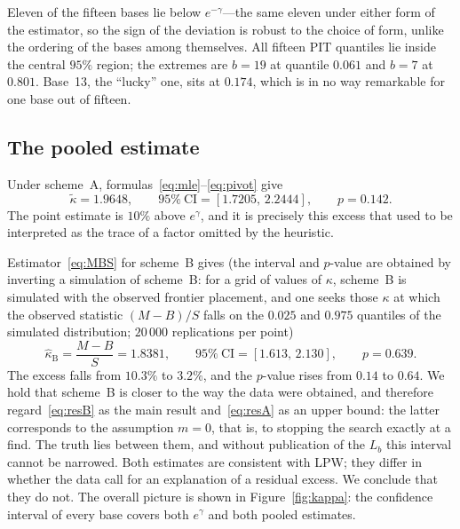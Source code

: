 \documentclass[11pt,a4paper]{article}
\theoremstyle{plain}
\theoremstyle{remark}
\newcommand{\eg}{e^{\gamma}}
\newcommand{\emg}{e^{-\gamma}}
\begin{document}
Eleven of the fifteen bases lie below $\emg$---the same eleven under either form
of the estimator, so the sign of the deviation is robust to the choice of form,
unlike the ordering of the bases among themselves. All fifteen PIT quantiles lie
inside the central $95\%$ region; the extremes are $b=19$ at quantile $0.061$
and $b=7$ at $0.801$. Base~13, the ``lucky'' one, sits at $0.174$, which is in
no way remarkable for one base out of fifteen.

\subsection{The pooled estimate}\label{sec:pooled}

Under scheme~A, formulas~\eqref{eq:mle}--\eqref{eq:pivot} give
\begin{equation}\label{eq:resA}
\tilde\kappa=1.9648,\qquad 95\%\ \text{CI}=[1.7205,\,2.2444],\qquad p=0.142 .
\end{equation}
The point estimate is $10\%$ above $\eg$, and it is precisely this excess that
used to be interpreted as the trace of a factor omitted by the heuristic.

Estimator~\eqref{eq:MBS} for scheme~B gives (the interval and $p$-value are
obtained by inverting a simulation of scheme~B: for a grid of values of $\kappa$,
scheme~B is simulated with the observed frontier placement, and one seeks those
$\kappa$ at which the observed statistic $(M-B)/S$ falls on the $0.025$ and
$0.975$ quantiles of the simulated distribution; $20\,000$ replications per
point)
\begin{equation}\label{eq:resB}
\hat\kappa_{\mathrm B}=\frac{M-B}{S}=1.8381,\qquad
95\%\ \text{CI}=[1.613,\,2.130],\qquad p=0.639 .
\end{equation}
The excess falls from $10.3\%$ to $3.2\%$, and the $p$-value rises from $0.14$
to $0.64$. We hold that scheme~B is closer to the way the data were obtained,
and therefore regard~\eqref{eq:resB} as the main result and~\eqref{eq:resA} as an
upper bound: the latter corresponds to the assumption $m=0$, that is, to
stopping the search exactly at a find. The truth lies between them, and without
publication of the $L_b$ this interval cannot be narrowed. Both estimates are
consistent with LPW; they differ in whether the data call for an explanation of
a residual excess. We conclude that they do not. The overall picture is shown in
Figure~\ref{fig:kappa}: the confidence interval of every base covers both $\eg$
and both pooled estimates.
\end{document}

